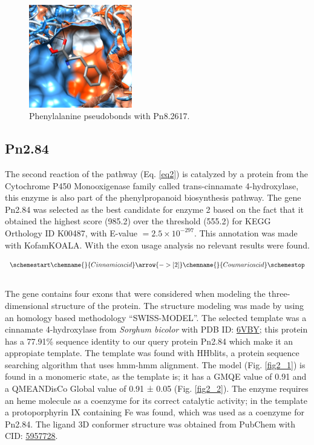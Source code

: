 \documentclass[12pt]{article}
\begin{document}
	\FloatBarrier
	\begin{figure}[H]
		\centering
		\includegraphics[width=0.4\textwidth]{../1/Dock/chimera.png}
		\caption{Phenylalanine pseudobonds with Pn8.2617.}
		\label{fig1_4}
	\end{figure}
	\FloatBarrier
	
	\subsection{Pn2.84}
	
	The second reaction of the pathway (Eq. \ref{eq2}) is catalyzed by a protein from the Cytochrome P450 Monooxigenase family called trans-cinnamate 4-hydroxylase, this enzyme is also part of the phenylpropanoid biosynthesis pathway. The gene Pn2.84 was selected as the best candidate for enzyme 2 based on the fact that it obtained the highest score (985.2) over the threshold (555.2) for KEGG Orthology ID K00487, with E-value $=2.5\times10^{-297}$. This annotation was made with KofamKOALA. \cite{kofamkoala} With the exon usage analysis no relevant results were found.
	
	\begin{equation}
	\schemestart
	\label{eq2}
	\chemname{\footnotesize}{Cinnamic acid}\arrow{->[\footnotesize 2]}\chemname{\footnotesize}{Coumaric acid}
	\schemestop
	\end{equation}\\
	
	The gene contains four exons that were considered when modeling the three-dimensional structure of the protein. The structure modeling was made by using an homology based methodology ``SWISS-MODEL''. \cite{swiss} The selected template was a cinnamate 4-hydroxylase from \textit{Sorghum bicolor} with PDB ID: \href{https://www.rcsb.org/structure/6VBY}{6VBY}; this protein has a 77.91\% sequence identity to our query protein Pn2.84 which make it an appropiate template. The template was found with HHblits, a protein sequence searching algorithm that uses hmm-hmm alignment. \cite{hhblits} The model (Fig. \ref{fig2_1}) is found in a monomeric state, as the template is; it has a GMQE value of 0.91 and a QMEANDisCo Global value of 0.91 ± 0.05 (Fig. \ref{fig2_2}). \cite{qmeandisco_swiss} The enzyme requires an heme molecule as a coenzyme for its correct catalytic activity; in the template a protoporphyrin IX containing Fe was found, which was used as a coenzyme for Pn2.84. The ligand 3D conformer structure was obtained from PubChem with CID: \href{https://pubchem.ncbi.nlm.nih.gov/compound/5957728}{5957728}.
	
\end{document}

